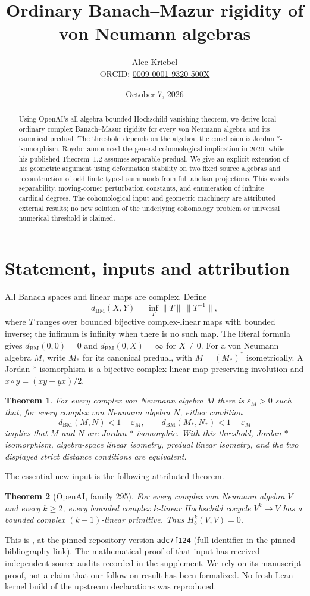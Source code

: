 \documentclass[11pt]{article}
\title{Ordinary Banach--Mazur rigidity of von Neumann algebras}
\author{Alec Kriebel\\\small ORCID: \href{https://orcid.org/0009-0001-9320-500X}{0009-0001-9320-500X}}
\date{October 7, 2026}
\newtheorem{theorem}{Theorem}
\newcommand{\BM}{d_{\mathrm{BM}}}
\newcommand{\Hb}{H_b}
\begin{document}
\maketitle
\begin{abstract}
Using OpenAI's all-algebra bounded Hochschild vanishing theorem, we derive
local ordinary complex Banach--Mazur rigidity for every von Neumann
algebra and its canonical predual. The threshold depends on the algebra;
the conclusion is Jordan $*$-isomorphism. Roydor announced the general
cohomological implication in 2020, while his published Theorem~1.2 assumes
separable predual. We give an explicit extension of his geometric argument
using deformation stability on two fixed source algebras and reconstruction
of odd finite type-I summands from full abelian projections. This avoids
separability, moving-corner perturbation constants, and enumeration of
infinite cardinal degrees. The cohomological input and geometric machinery
are attributed external results; no new solution of the underlying
cohomology problem or universal numerical threshold is claimed.
\end{abstract}

\section{Statement, inputs and attribution}
All Banach spaces and linear maps are complex. Define
\[
 \BM(X,Y)=\inf_T\|T\|\,\|T^{-1}\|,
\]
where $T$ ranges over bounded bijective complex-linear maps with bounded
inverse; the infimum is infinity when there is no such map. The literal
formula gives $\BM(0,0)=0$ and $\BM(0,X)=\infty$ for $X\ne0$.
For a von Neumann algebra $M$, write $M_*$ for its canonical predual, with
$M=(M_*)^*$ isometrically. A Jordan $*$-isomorphism is a bijective
complex-linear map preserving involution and $x\circ y=(xy+yx)/2$.

\begin{theorem}\label{thm:main}
For every complex von Neumann algebra $M$ there is $\varepsilon_M>0$
such that, for every complex von Neumann algebra $N$, either condition
\[
 \BM(M,N)<1+\varepsilon_M,
 \qquad \BM(M_*,N_*)<1+\varepsilon_M
\]
implies that $M$ and $N$ are Jordan $*$-isomorphic. With this threshold,
Jordan $*$-isomorphism, algebra-space linear isometry, predual linear
isometry, and the two displayed strict distance conditions are equivalent.
\end{theorem}

The essential new input is the following attributed theorem.
\begin{theorem}[OpenAI, family 295]\label{thm:input}
For every complex von Neumann algebra $V$ and every $k\ge2$,
every bounded complex $k$-linear Hochschild cocycle $V^k\to V$
has a bounded complex $(k-1)$-linear primitive. Thus $\Hb^k(V,V)=0$.
\end{theorem}
This is \cite[Theorem 1.1]{OAI295}, at the pinned repository version
\texttt{adc7f124} (full identifier in the pinned bibliography link). The mathematical proof
of that input has received independent source audits recorded in the
supplement. We rely on its manuscript proof, not a claim that our
follow-on result has been formalized. No fresh Lean kernel build of the
upstream declarations was reproduced.
\end{document}
